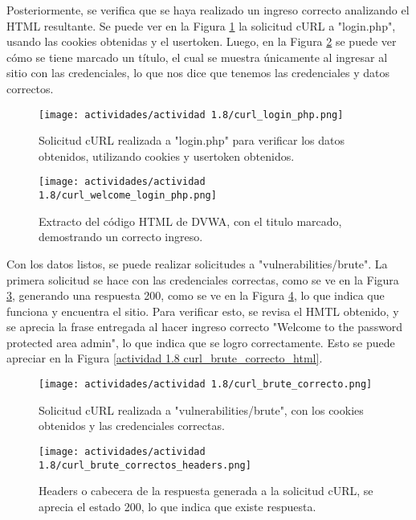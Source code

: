 \documentclass[letter,12pt]{article}
\begin{document}
Posteriormente, se verifica que se haya realizado un ingreso correcto analizando el HTML resultante. Se puede ver en la Figura \ref{actividad 1.8 curl_login_php} la solicitud cURL a "login.php", usando las cookies obtenidas y el usertoken. Luego, en la Figura \ref{actividad 1.8 curl_welcome} se puede ver cómo se tiene marcado un título, el cual se muestra únicamente al ingresar al sitio con las credenciales, lo que nos dice que tenemos las credenciales y datos correctos.

\begin{figure}[H]
    \centering
    \texttt{[image: actividades/actividad 1.8/curl\_login\_php.png]}
    \caption{Solicitud cURL realizada a "login.php" para verificar los datos obtenidos, utilizando cookies y usertoken obtenidos.}
    \label{actividad 1.8 curl_login_php}
\end{figure}

\begin{figure}[H]
    \centering
    \texttt{[image: actividades/actividad 1.8/curl\_welcome\_login\_php.png]}
    \caption{Extracto del código HTML de DVWA, con el titulo marcado, demostrando un correcto ingreso.}
    \label{actividad 1.8 curl_welcome}
\end{figure}

Con los datos listos, se puede realizar solicitudes a "vulnerabilities/brute". La primera solicitud se hace con las credenciales correctas, como se ve en la Figura \ref{actividad 1.8 curl_brute_correcto}, generando una respuesta 200, como se ve en la Figura \ref{actividad 1.8 curl_brute_correctos_headers}, lo que indica que funciona y encuentra el sitio. Para verificar esto, se revisa el HMTL obtenido, y se aprecia la frase entregada al hacer ingreso correcto "Welcome to the password protected area admin", lo que indica que se logro correctamente. Esto se puede apreciar en la Figura \ref{actividad 1.8 curl_brute_correcto_html}.

\begin{figure}[H]
    \centering
    \texttt{[image: actividades/actividad 1.8/curl\_brute\_correcto.png]}
    \caption{Solicitud cURL realizada a "vulnerabilities/brute", con los cookies obtenidos y las credenciales correctas.}
    \label{actividad 1.8 curl_brute_correcto}
\end{figure}

\begin{figure}[H]
    \centering
    \texttt{[image: actividades/actividad 1.8/curl\_brute\_correctos\_headers.png]}
    \caption{Headers o cabecera de la respuesta generada a la solicitud cURL, se aprecia el estado 200, lo que indica que existe respuesta.}
    \label{actividad 1.8 curl_brute_correctos_headers}
\end{figure}
\end{document}

